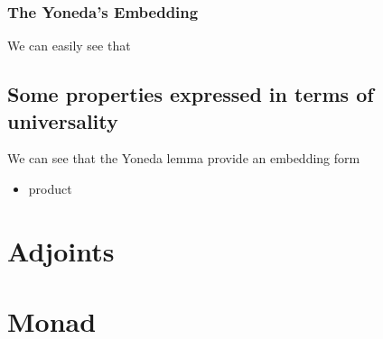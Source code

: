 \subsubsection{The Yoneda's Embedding}
We can easily see that 


\subsection{Some properties expressed in terms of universality}
We can see that the Yoneda lemma provide an embedding form 

\begin{itemize}
\item product \label{prod-univ}
\end{itemize}
\section{Adjoints}


\section{Monad}